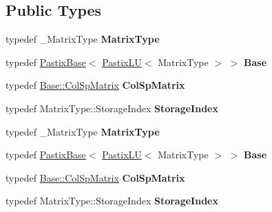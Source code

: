 \subsection*{Public Types}
\begin{DoxyCompactItemize}
\item 
\mbox{\label{class_eigen_1_1_pastix_l_u_a381b6169c2fc056bef401bb621d72b66}} 
typedef \+\_\+\+Matrix\+Type {\bfseries Matrix\+Type}
\item 
\mbox{\label{class_eigen_1_1_pastix_l_u_ad19f8707fc3e419710cfbd7d1f4595a7}} 
typedef \hyperlink{class_eigen_1_1_pastix_base}{Pastix\+Base}$<$ \hyperlink{class_eigen_1_1_pastix_l_u}{Pastix\+LU}$<$ Matrix\+Type $>$ $>$ {\bfseries Base}
\item 
\mbox{\label{class_eigen_1_1_pastix_l_u_ab010577a9123541027c9fc89db42107c}} 
typedef \hyperlink{group___sparse_core___module}{Base\+::\+Col\+Sp\+Matrix} {\bfseries Col\+Sp\+Matrix}
\item 
\mbox{\label{class_eigen_1_1_pastix_l_u_a34946041be30db32d0511da40e542406}} 
typedef Matrix\+Type\+::\+Storage\+Index {\bfseries Storage\+Index}
\item 
\mbox{\label{class_eigen_1_1_pastix_l_u_a381b6169c2fc056bef401bb621d72b66}} 
typedef \+\_\+\+Matrix\+Type {\bfseries Matrix\+Type}
\item 
\mbox{\label{class_eigen_1_1_pastix_l_u_ad19f8707fc3e419710cfbd7d1f4595a7}} 
typedef \hyperlink{class_eigen_1_1_pastix_base}{Pastix\+Base}$<$ \hyperlink{class_eigen_1_1_pastix_l_u}{Pastix\+LU}$<$ Matrix\+Type $>$ $>$ {\bfseries Base}
\item 
\mbox{\label{class_eigen_1_1_pastix_l_u_ab010577a9123541027c9fc89db42107c}} 
typedef \hyperlink{group___sparse_core___module}{Base\+::\+Col\+Sp\+Matrix} {\bfseries Col\+Sp\+Matrix}
\item 
\mbox{\label{class_eigen_1_1_pastix_l_u_a34946041be30db32d0511da40e542406}} 
typedef Matrix\+Type\+::\+Storage\+Index {\bfseries Storage\+Index}
\end{DoxyCompactItemize}
